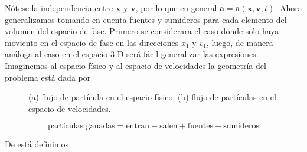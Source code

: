 N\'otese la independencia entre $\textbf{x}$ y $\textbf{v}$, por lo que en general $\textbf{a} = \textbf{a}(\textbf{x},\textbf{v}, t)$. Ahora generalizamos tomando en cuenta fuentes y sumideros para cada elemento del volumen del espacio de fase. Primero se considerara el caso donde solo haya moviento en el espacio de fase en las direcciones $x_1$ y $v_{1}$, luego, de manera an\'aloga al caso en el espacio 3-D ser\'a f\'acil generalizar las expresiones. Imaginemos al espacio f\'isico y al espacio de velocidades la geometr\'ia del problema est\'a dada por 

\begin{figure}[h!]
  \label{fig:fasespace}
  \centering
  \begin{subfigure}{0.49\textwidth}
    \caption{}
  \end{subfigure}
  \begin{subfigure}{0.49\textwidth}
    \caption{}
  \end{subfigure}
  \caption{(a) flujo de part\'icula en el espacio f\'isico. (b) flujo de part\'iculas en el espacio de velocidades.}
\end{figure}

\begin{equation*}
  \text{part\'iculas ganadas} = \text{entran} - \text{salen} + \text{fuentes} - \text{sumideros}
\end{equation*}

De está definimos

